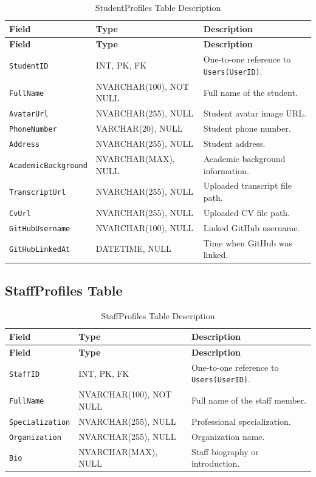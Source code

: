 \begin{longtable}{|>{\raggedright\arraybackslash}m{2.9cm}|>{\raggedright\arraybackslash}m{3.45cm}|>{\raggedright\arraybackslash}m{4.95cm}|}
\caption{StudentProfiles Table Description}
\label{tab:student_profiles_table_description}
\\
\hline
\textbf{Field} & \textbf{Type} & \textbf{Description} \\
\hline
\endfirsthead
\hline
\textbf{Field} & \textbf{Type} & \textbf{Description} \\
\hline
\endhead
\texttt{StudentID} & INT, PK, FK & One-to-one reference to \texttt{Users(UserID)}. \\
\hline
\texttt{FullName} & NVARCHAR(100), NOT NULL & Full name of the student. \\
\hline
\texttt{AvatarUrl} & NVARCHAR(255), NULL & Student avatar image URL. \\
\hline
\texttt{PhoneNumber} & VARCHAR(20), NULL & Student phone number. \\
\hline
\texttt{Address} & NVARCHAR(255), NULL & Student address. \\
\hline
\texttt{AcademicBackground} & NVARCHAR(MAX), NULL & Academic background information. \\
\hline
\texttt{TranscriptUrl} & NVARCHAR(255), NULL & Uploaded transcript file path. \\
\hline
\texttt{CvUrl} & NVARCHAR(255), NULL & Uploaded CV file path. \\
\hline
\texttt{GitHubUsername} & NVARCHAR(100), NULL & Linked GitHub username. \\
\hline
\texttt{GitHubLinkedAt} & DATETIME, NULL & Time when GitHub was linked. \\
\hline
\end{longtable}

\subsection{StaffProfiles Table}

\begin{longtable}{|>{\raggedright\arraybackslash}m{2.9cm}|>{\raggedright\arraybackslash}m{3.45cm}|>{\raggedright\arraybackslash}m{4.95cm}|}
\caption{StaffProfiles Table Description}
\label{tab:staff_profiles_table_description}
\\
\hline
\textbf{Field} & \textbf{Type} & \textbf{Description} \\
\hline
\endfirsthead
\hline
\textbf{Field} & \textbf{Type} & \textbf{Description} \\
\hline
\endhead
\texttt{StaffID} & INT, PK, FK & One-to-one reference to \texttt{Users(UserID)}. \\
\hline
\texttt{FullName} & NVARCHAR(100), NOT NULL & Full name of the staff member. \\
\hline
\texttt{Specialization} & NVARCHAR(255), NULL & Professional specialization. \\
\hline
\texttt{Organization} & NVARCHAR(255), NULL & Organization name. \\
\hline
\texttt{Bio} & NVARCHAR(MAX), NULL & Staff biography or introduction. \\
\hline
\end{longtable}

